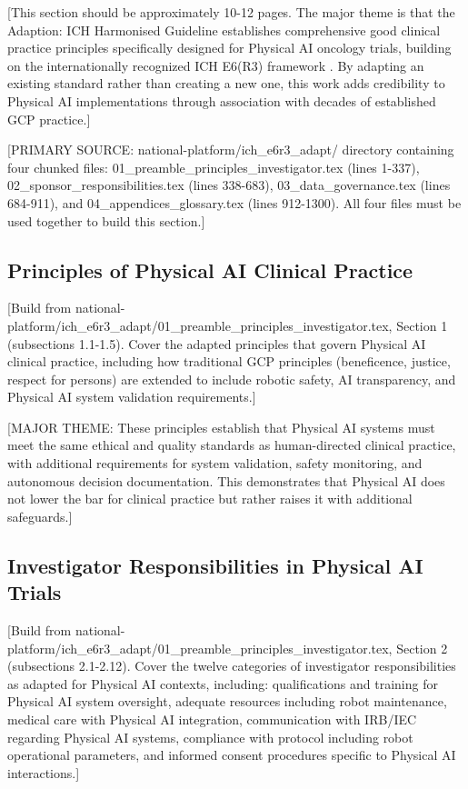 
[This section should be approximately 10-12 pages. The major theme is that the
Adaption: ICH Harmonised Guideline \cite{ich-adapt} establishes comprehensive
good clinical practice principles specifically designed for Physical AI oncology
trials, building on the internationally recognized ICH E6(R3) framework
\cite{ich-e6r3}. By adapting an existing standard rather than creating a new
one, this work adds credibility to Physical AI implementations through
association with decades of established GCP practice.]

[PRIMARY SOURCE: national-platform/ich\_e6r3\_adapt/ directory containing four
chunked files: 01\_preamble\_principles\_investigator.tex (lines 1-337),
02\_sponsor\_responsibilities.tex (lines 338-683),
03\_data\_governance.tex (lines 684-911), and
04\_appendices\_glossary.tex (lines 912-1300). All four files must be used
together to build this section.]

\subsection{Principles of Physical AI Clinical Practice}
\label{subsec:ich-principles}

[Build from national-platform/ich\_e6r3\_adapt/01\_preamble\_principles\_investigator.tex,
Section 1 (subsections 1.1-1.5). Cover the adapted principles that govern
Physical AI clinical practice, including how traditional GCP principles
(beneficence, justice, respect for persons) are extended to include robotic
safety, AI transparency, and Physical AI system validation requirements.]

[MAJOR THEME: These principles establish that Physical AI systems must meet the
same ethical and quality standards as human-directed clinical practice, with
additional requirements for system validation, safety monitoring, and
autonomous decision documentation. This demonstrates that Physical AI does not
lower the bar for clinical practice but rather raises it with additional
safeguards.]

\subsection{Investigator Responsibilities in Physical AI Trials}
\label{subsec:ich-investigator}

[Build from national-platform/ich\_e6r3\_adapt/01\_preamble\_principles\_investigator.tex,
Section 2 (subsections 2.1-2.12). Cover the twelve categories of investigator
responsibilities as adapted for Physical AI contexts, including:
qualifications and training for Physical AI system oversight, adequate
resources including robot maintenance, medical care with Physical AI
integration, communication with IRB/IEC regarding Physical AI systems,
compliance with protocol including robot operational parameters, and
informed consent procedures specific to Physical AI interactions.]


